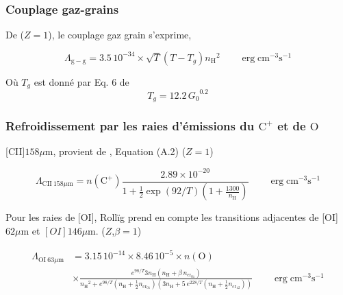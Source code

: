 
\subsubsection{Couplage gaz-grains}

De \cite{Rollig2005} ($Z=1$), le couplage gaz grain s'exprime,

\begin{equation}
    \Lambda_{\mathrm{g}-\mathrm{g}} = 3.5\,10^{-34}\times \sqrt{T}(T - T_g) {n_\mathrm{H}}^2 \qquad \operatorname{erg} \mathrm{cm}^{-3} \mathrm{s}^{-1}
\end{equation}

Où $T_g$ est donné par Eq. 6 de \cite{HollenbachTakahashiTielens_1991}
\begin{equation}
    T_g = 12.2 \,{G_0}^{0.2}
\end{equation}



\subsubsection{Refroidissement par les raies d'émissions du $\mathrm{C}^+$ et de $\mathrm{O}$}

[CII]$158 \mu \mathrm{m}$, provient de \cite{Rollig2005}, Equation (A.2) ($Z=1$)

\begin{equation}
    \Lambda_{\mathrm{CII}\ 158   \mu \mathrm{m}}= n(\mathrm{C}^+) \frac{2.89 \times 10^{-20}}{1+\frac{1}{2} \exp (92 / T)\left(1+\frac{1300}{n_\mathrm{H}}\right)} \qquad \operatorname{erg} \mathrm{cm}^{-3} \mathrm{s}^{-1}
\end{equation}

Pour les raies de [OI], Rollïg prend en compte les transitions adjacentes de [OI]$62 \mu \mathrm{m}$ et $[OI]146 \mu \mathrm{m}$. ($Z$,$\beta = 1$)


\begin{equation}
\begin{split}
    \Lambda_{\mathrm{OI}\ 63 \mu \mathrm{m}} &= 3.15\,10^{-14} \times 8.46\,10^{-5} \times 
    n(\mathrm{O}) \\
    & \times \frac{e^{98/T} 3 n_\mathrm{H} (n_\mathrm{H} + \beta\, n_{\mathrm{cr}_{01}} ) }{{n_\mathrm{H}}^2+ e^{98/T}(n_\mathrm{H} + \frac{1}{2} n_{\mathrm{cr}_{01}} ) (3 n_\mathrm{H} + 5\, e^{228/T} (n_\mathrm{H} + \frac{1}{2} n_{\mathrm{cr}_{12}} )) } \qquad \operatorname{erg} \mathrm{cm}^{-3} \mathrm{s}^{-1}
\end{split}
\end{equation}

